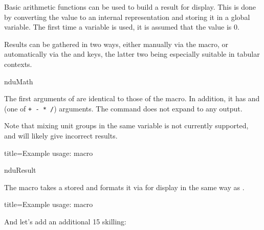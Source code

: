 \documentclass[
	a4paper,
]{article}
\begin{document}
Basic arithmetic functions can be used to build a result for display. This is done by converting the value to an internal representation and storing it in a global variable. The first time a variable is used, it is assumed that the value is 0.

Results can be gathered in two ways, either manually via the  macro, or automatically via the  and  keys, the latter two being especially suitable in tabular contexts.

\begin{docCommand}
	{nduMath}
	{}

	The first arguments of  are identical to those of the  macro. In addition, it has  and  (one of \texttt{+ - * /}) arguments. The command does not expand to any output.

	Note that mixing unit groups in the same variable is not currently supported, and will likely give incorrect results.

\begin{dispExample*}{
	title=Example usage:  macro
}
\end{dispExample*}

\end{docCommand}

\begin{docCommand}
	{nduResult}
	{}

	The  macro takes a stored  and formats it via  for display in the same way as .

\begin{dispExample*}{
	title=Example usage:  macro
}

And let's add an additional 15 skilling:
\end{dispExample*}

\end{docCommand}
\end{document}
